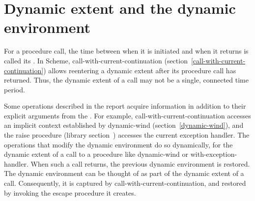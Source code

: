 \section{Dynamic extent and the dynamic environment}
\label{dynamicenvironmentsection}

For a procedure call, the time between when it is initiated and when
it returns is called its .  In Scheme, {\cf
  call-with-current-continuation}
(section~\ref{call-with-current-continuation}) allows reentering a
dynamic extent after its procedure call has returned.  Thus, the
dynamic extent of a call may not be a single, connected time period.

Some operations described in the report acquire information in
addition to their explicit arguments from the .  For example, {\cf call-\hp{}with-\hp{}current-\hp{}continuation}
accesses an implicit context established
by {\cf dynamic-wind} (section~\ref{dynamic-wind}), and the {\cf
  raise} procedure (library
section~) accesses the
current exception handler.  The operations that modify the dynamic
environment do so dynamically, for the dynamic extent of a call to a
procedure like {\cf dynamic-wind} or {\cf with-exception-handler}.
When such a call returns, the previous dynamic environment is
restored.  The dynamic environment can be thought of as part of the
dynamic extent of a call.  Consequently, it is captured by {\cf
  call-with-current-continuation}, and restored by invoking the escape
procedure it creates.

